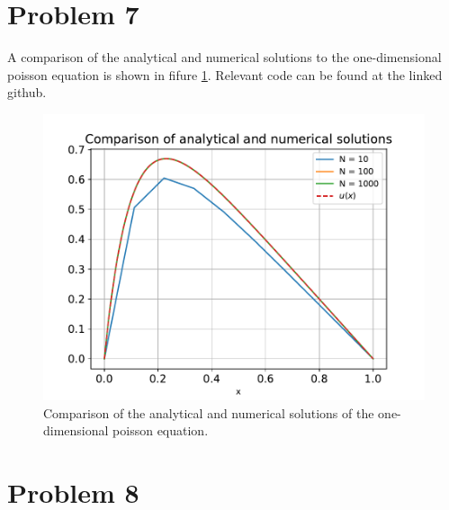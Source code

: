 \documentclass[english,notitlepage]{revtex4-1}  %
\begin{document}
        
\section*{Problem 7}
    A comparison of the analytical and numerical solutions to the one-dimensional poisson equation is shown in fifure \ref{comparison_plot}.
    Relevant code can be found at the linked github.
    \begin{figure}[!ht]
        \centering
        \includegraphics[scale=0.6]{comparison.pdf}
        \caption{Comparison of the analytical and numerical solutions of the one-dimensional poisson equation.}
        \label{comparison_plot}
    \end{figure}
        
    
\section*{Problem 8}
\end{document}
